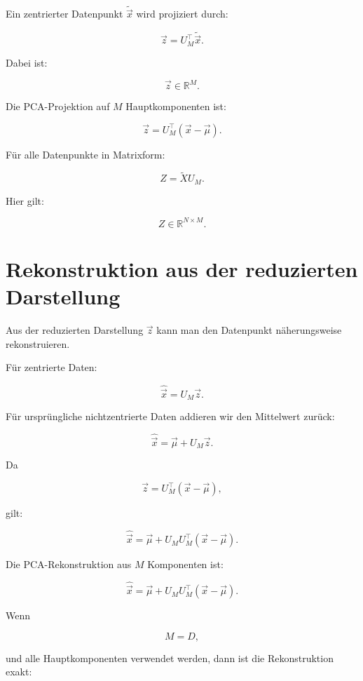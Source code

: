 Ein zentrierter Datenpunkt \(\tilde{\vec{x}}\) wird projiziert durch:

\[
    \vec{z}
    =
    U_M^{\top}\tilde{\vec{x}}.
\]

Dabei ist:

\[
    \vec{z}\in\mathbb{R}^M.
\]

\begin{definitionbox}
Die PCA-Projektion auf \(M\) Hauptkomponenten ist:

\[
    \vec{z}
    =
    U_M^{\top}(\vec{x}-\vec{\mu}).
\]
\end{definitionbox}

Für alle Datenpunkte in Matrixform:

\[
    Z
    =
    \tilde{X}U_M.
\]

Hier gilt:

\[
    Z\in\mathbb{R}^{N\times M}.
\]

\section{Rekonstruktion aus der reduzierten Darstellung}

Aus der reduzierten Darstellung \(\vec{z}\) kann man den Datenpunkt näherungsweise rekonstruieren.

Für zentrierte Daten:

\[
    \hat{\vec{x}}
    =
    U_M\vec{z}.
\]

Für ursprüngliche nichtzentrierte Daten addieren wir den Mittelwert zurück:

\[
    \hat{\vec{x}}
    =
    \vec{\mu}
    +
    U_M\vec{z}.
\]

Da

\[
    \vec{z}
    =
    U_M^{\top}
    (\vec{x}-\vec{\mu}),
\]

gilt:

\[
    \hat{\vec{x}}
    =
    \vec{\mu}
    +
    U_MU_M^{\top}
    (\vec{x}-\vec{\mu}).
\]

\begin{definitionbox}
Die PCA-Rekonstruktion aus \(M\) Komponenten ist:

\[
    \hat{\vec{x}}
    =
    \vec{\mu}
    +
    U_MU_M^{\top}
    (\vec{x}-\vec{\mu}).
\]
\end{definitionbox}

Wenn

\[
    M=D,
\]

und alle Hauptkomponenten verwendet werden, dann ist die Rekonstruktion exakt:


